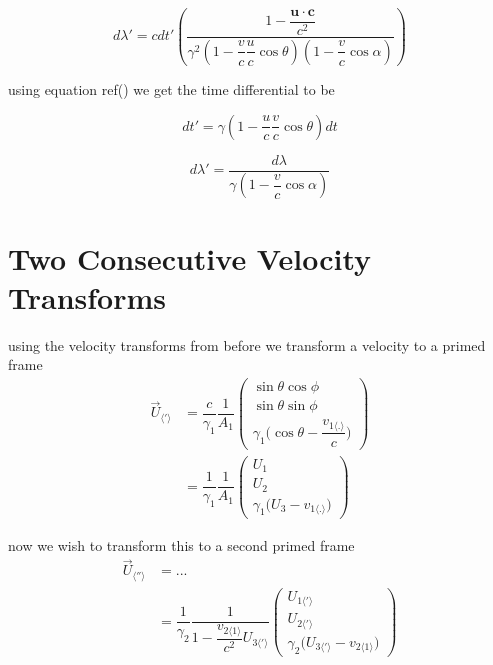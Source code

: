 \begin{equation}
	d\lambda' = c dt' \left( \dfrac{  1 - \dfrac{\mathbf{u}\cdot\mathbf{c}}{c^2}  }
	{ \gamma^2 \left(1-\dfrac{v}{c}\dfrac{u}{c}\cos\theta \right) \left(1-\dfrac{v}{c}\cos\alpha \right)} \right)
\end{equation}

using equation ref() we get the time differential to be

\begin{equation}
	dt' = \gamma \left( 1 - \dfrac{u}{c}\dfrac{v}{c}\cos\theta \right) dt
\end{equation}

\begin{equation}
	d\lambda' = \dfrac{ d\lambda }{ \gamma \left(1-\dfrac{v}{c}\cos\alpha \right)}
\end{equation}



\chapter{Two Consecutive Velocity Transforms}
using the velocity transforms from before we transform a velocity to a primed frame
\begin{equation}%
    \begin{split}
    \vec{U}_{\langle ' \rangle}
    &= \dfrac{c}{\gamma_1} \dfrac{1}{A_1} \begin{pmatrix}
    \sin\theta\cos\phi\\ \sin\theta\sin\phi\\ \gamma_1\Big(\cos\theta - \dfrac{v_{1\langle . \rangle}}{c}\Big)
    \end{pmatrix} \\
    &= \dfrac{1}{\gamma_1} \dfrac{1}{A_1} \begin{pmatrix}
    U_1\\ U_2\\ \gamma_1\Big(U_3 - v_{1\langle . \rangle}\Big)
    \end{pmatrix}
    \end{split}
\end{equation}%

now we wish to transform this to a second primed frame
\begin{equation}%
    \begin{split}
    \vec{U}_{\langle '' \rangle}
    &= ... \\
    &= \dfrac{1}{\gamma_2} \dfrac{1}{1-\dfrac{v_{2\langle 1 \rangle}}{c^2}U_{3\langle'\rangle}} \begin{pmatrix}
    U_{1\langle'\rangle}\\ U_{2\langle'\rangle}\\ \gamma_2\Big(U_{3\langle'\rangle} - v_{2\langle 1 \rangle} \Big)
    \end{pmatrix}
    \end{split}
\end{equation}%

